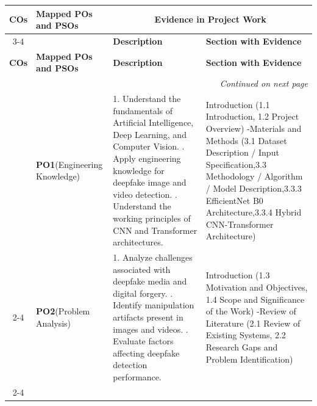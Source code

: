 \documentclass[12pt,a4paper]{report}
\begin{document}
\begin{longtable}{|c|p{2.5cm}|p{7.5cm}|p{4.0cm}|}
\hline
\centering\textbf{COs} &
\centering\textbf{Mapped POs and PSOs} &
\multicolumn{2}{c|}{\textbf{Evidence in Project Work}}
\\ \cline{3-4}

& &
\centering\textbf{Description} &
\centering\textbf{Section with Evidence}
\\ %

\endfirsthead

\hline
\centering\textbf{COs} & 
\centering\textbf{Mapped POs and PSOs} & 
\centering\textbf{Description} &
{\centering\textbf{Section with Evidence}} \\
\hline
\endhead

\hline
\multicolumn{4}{r}{\textit{Continued on next page}}\\
\endfoot

\hline
\endlastfoot

\hline
\multirow{3}{*}{\textbf{CO1}}
& {\textbf{PO1}\newline(Engineering Knowledge)}
& 1. Understand the fundamentals of Artificial Intelligence, Deep Learning, and Computer Vision.
  \newline 2. Apply engineering knowledge for deepfake image and video detection.
  \newline 3. Understand the working principles of CNN and Transformer architectures.
& Introduction (1.1 Introduction, 1.2 Project Overview) -Materials and Methods (3.1 Dataset Description / Input Specification,3.3 Methodology / Algorithm / Model Description,3.3.3 EfficientNet B0 Architecture,3.3.4 Hybrid CNN-Transformer Architecture) \\ \cline{2-4}

& {\textbf{PO2}\newline(Problem Analysis)}
& 1. Analyze challenges associated with deepfake media and digital forgery.
  \newline 2. Identify manipulation artifacts present in images and videos.
  \newline 3. Evaluate factors affecting deepfake detection performance.
& Introduction (1.3 Motivation and Objectives, 1.4 Scope and Significance of the Work) -Review of Literature (2.1 Review of Existing Systems, 2.2 Research Gaps and Problem Identification) \\ \cline{2-4}


\end{longtable}
\end{document}
